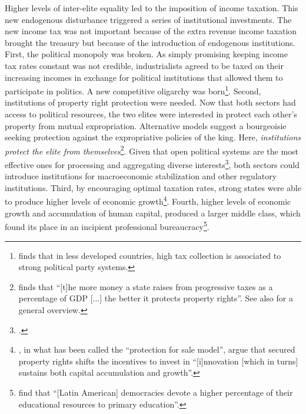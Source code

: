 \documentclass[onesided]{article}\usepackage[]{graphicx}\usepackage[]{color}
\begin{document}
Higher levels of inter-elite equality led to the imposition of income taxation. This new endogenous disturbance triggered a series of institutional investments. The new income tax was not important because of the extra revenue income taxation brought the treasury but because of the introduction of endogenous institutions.  First, the political monopoly was broken. As simply promising keeping income tax rates constant was not credible, industrialists agreed to be taxed on their increasing incomes in exchange for political institutions that allowed them to participate in politics. A new competitive oligarchy was born\footnote{
	\citet[p. 8]{DiJohn2006} finds that in less developed countries, high tax collection is associated to strong political party systems.
}. Second, institutions of property right protection were needed. Now that both sectors had access to political resources, the two elites were interested in protect each other's property from mutual expropriation. Alternative models suggest a bourgeoisie seeking protection against the expropriative policies of the king. Here, \emph{institutions protect the elite from themselves}\footnote{
	 \citet[p. 531]{Timmons2005} finds that ``[t]he more money a state raises from progressive taxes as a percentage of GDP [...] the better it protects property rights''.  See also \citet[p. 6]{Roclrik2000} for a general overview.
}. Given that open political systems are the most effective ones for processing and aggregating diverse interests\footnote{\citet[p. 3]{Roclrik2000}.}, both sectors could introduce institutions for macroeconomic stabilization and other regulatory institutions. Third, by encouraging optimal taxation rates, strong states were able to produce higher levels of economic growth\footnote{
	\citet[p. 35]{Grossman1994}, in what has been called the ``protection for sale model'', argue that secured property rights shifts the incentives to invest in ``[i]nnovation [which in turns] sustains both capital accumulation and growth''.
}. Fourth, higher levels of economic growth and accumulation of human capital, produced a larger middle class, which found its place in an incipient professional bureaucracy\footnote{
	\citet[p. 842]{Brown2004} find that ``[Latin American] democracies devote a higher percentage of their educational resources to primary education''.
}.
\end{document}
